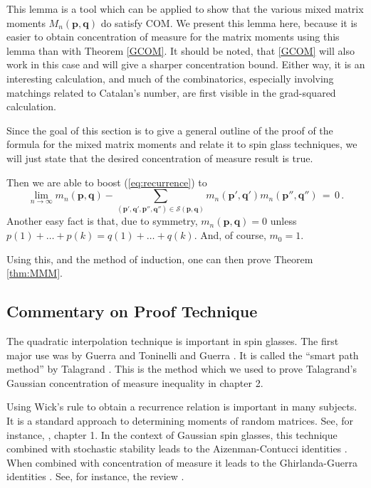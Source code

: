 \documentclass[12pt]{report}
\theoremstyle{definition}
\begin{document}
This lemma is a tool which can be applied to show that the various mixed matrix moments $M_n(\mathbf{p},\mathbf{q})$
do satisfy COM.  We present this lemma here, because it is easier to obtain concentration of measure for the matrix moments using this lemma than with Theorem \ref{GCOM}.  It should be noted, that \ref{GCOM} will also work in this case and will give a sharper concentration bound.  
Either way, it is an interesting calculation, and much of the combinatorics, especially involving matchings related to Catalan's number,
are first visible in the grad-squared calculation.

Since the goal of this section is to give a general outline of the proof of the formula for the mixed matrix moments and relate it to spin glass techniques, we will just state that the desired concentration of measure result is true.

Then we are able to boost (\ref{eq:recurrence}) to 
\begin{equation}
\label{eq:recur2}
\lim_{n \to \infty} m_n(\mathbf{p},\mathbf{q}) - 
\sum_{(\mathbf{p}',\mathbf{q}',\mathbf{p}'',\mathbf{q}'') \in \mathcal{S}(\mathbf{p},\mathbf{q})} 
m_n(\mathbf{p}',\mathbf{q}') m_n(\mathbf{p}'',\mathbf{q}'')\, =\, 0\, .
\end{equation}
Another easy fact is that, due to symmetry, $m_n(\mathbf{p},\mathbf{q})=0$ unless $p(1)+\dots+p(k)=q(1)+\dots+q(k)$.
And, of course, $m_0=1$.

Using this, and the method of induction, one can then prove Theorem \ref{thm:MMM}.

\subsection{Commentary on Proof Technique}

The quadratic interpolation technique is important in spin glasses. 
The first major use was by Guerra and Toninelli \cite{GT} and Guerra \cite{G}.
It is called the ``smart path method'' by Talagrand \cite{Talagrand2}.  This is the method which we used to prove Talagrand's Gaussian concentration of measure inequality in chapter 2.  

Using Wick's rule to obtain a recurrence relation is important in many subjects.
It is a standard approach to determining moments of random matrices.
See, for instance, \cite{AndersonGuionnetZeitouni}, chapter 1.
In the context of Gaussian spin glasses, this technique combined with stochastic stability
leads to the Aizenman-Contucci identities \cite{AC}.
When combined with concentration of measure it leads to the Ghirlanda-Guerra identities \cite{GG}.
See, for instance, the review \cite{ContucciGiardina}.
\end{document}
